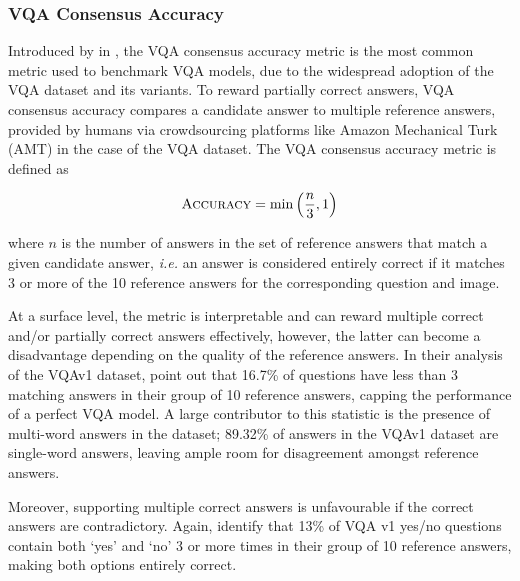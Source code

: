 \subsubsection{VQA Consensus Accuracy}
Introduced by \citeauthor{antol2015vqa} in \citeyear{antol2015vqa}, the VQA consensus accuracy metric is the most common metric used to benchmark VQA models, due to the widespread adoption of the VQA dataset and its variants. To reward partially correct answers, VQA consensus accuracy compares a candidate answer to multiple reference answers, provided by humans via crowdsourcing platforms like Amazon Mechanical Turk (AMT) in the case of the VQA dataset. The VQA consensus accuracy metric is defined as

\begin{equation}
    \textsc{Accuracy} = \min \left( \frac{n}{3}, 1 \right)
    \label{equation:vqa_consensus_accuracy}
\end{equation}

where \(n\) is the number of answers in the set of reference answers that match a given candidate answer, \textit{i.e.} an answer is considered entirely correct if it matches 3 or more of the 10 reference answers for the corresponding question and image.

At a surface level, the metric is interpretable and can reward multiple correct and/or partially correct answers effectively, however, the latter can become a disadvantage depending on the quality of the reference answers. In their analysis of the VQAv1 dataset, \citeauthor{kafle2017visual} point out that 16.7\% of questions have less than 3 matching answers in their group of 10 reference answers, capping the performance of a perfect VQA model. A large contributor to this statistic is the presence of multi-word answers in the dataset; 89.32\% of answers in the VQAv1 dataset are single-word answers, leaving ample room for disagreement amongst reference answers.

Moreover, supporting multiple correct answers is unfavourable if the correct answers are contradictory. Again, \citeauthor{kafle2017visual} identify that 13\% of VQA v1 yes/no questions contain both `yes' and `no' 3 or more times in their group of 10 reference answers, making both options entirely correct.



